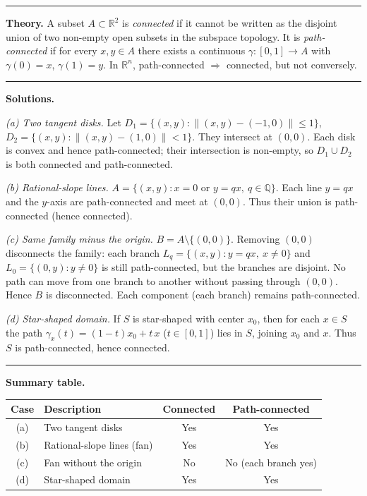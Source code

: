 \documentclass[12pt,a4paper]{article}
\theoremstyle{plain}
\theoremstyle{definition}
\theoremstyle{remark}
\theoremstyle{remark}
\newcommand{\sep}{\vspace{6pt}\hrule\vspace{8pt}}
\begin{document}
	\sep
	
	\textbf{Theory.}
	A subset $A\subset\mathbb{R}^2$ is \emph{connected} if it cannot be written
	as the disjoint union of two non-empty open subsets in the subspace topology.
	It is \emph{path-connected} if for every $x,y\in A$ there exists a continuous
	$\gamma:[0,1]\to A$ with $\gamma(0)=x$, $\gamma(1)=y$.
	In $\mathbb{R}^n$, path-connected $\Rightarrow$ connected, but not conversely.
	
	\sep
	
	\textbf{Solutions.}
	
	\textit{(a) Two tangent disks.}
	Let $D_1=\{(x,y):\|(x,y)-(-1,0)\|\le1\}$,
	$D_2=\{(x,y):\|(x,y)-(1,0)\|<1\}$.
	They intersect at $(0,0)$.
	Each disk is convex and hence path-connected;
	their intersection is non-empty,
	so $D_1\cup D_2$ is both connected and path-connected.
	
	\medskip
	
	\textit{(b) Rational-slope lines.}
	$A=\{(x,y):x=0\text{ or }y=qx,\ q\in\mathbb{Q}\}$.
	Each line $y=qx$ and the $y$-axis are path-connected and meet at $(0,0)$.
	Thus their union is path-connected (hence connected).
	
	\medskip
	
	\textit{(c) Same family minus the origin.}
	$B=A\setminus\{(0,0)\}$.
	Removing $(0,0)$ disconnects the family:
	each branch $L_q=\{(x,y):y=qx,\ x\neq0\}$ and $L_0=\{(0,y):y\neq0\}$
	is still path-connected, but the branches are disjoint.
	No path can move from one branch to another without passing through $(0,0)$.
	Hence $B$ is disconnected.
	Each component (each branch) remains path-connected.
	
	\medskip
	
	\textit{(d) Star-shaped domain.}
	If $S$ is star-shaped with center $x_0$,
	then for each $x\in S$ the path
	$\gamma_x(t)=(1-t)x_0+t\,x$ ($t\in[0,1]$)
	lies in $S$, joining $x_0$ and $x$.
	Thus $S$ is path-connected, hence connected.
	
	\sep
	
	\textbf{Summary table.}
	
	\begin{center}
		\begin{tabular}{c|l|c|c}
			Case & Description & Connected & Path-connected\\\hline
			(a) & Two tangent disks & Yes & Yes\\
			(b) & Rational-slope lines (fan) & Yes & Yes\\
			(c) & Fan without the origin & No & No (each branch yes)\\
			(d) & Star-shaped domain & Yes & Yes
		\end{tabular}
	\end{center}
	
\end{document}
